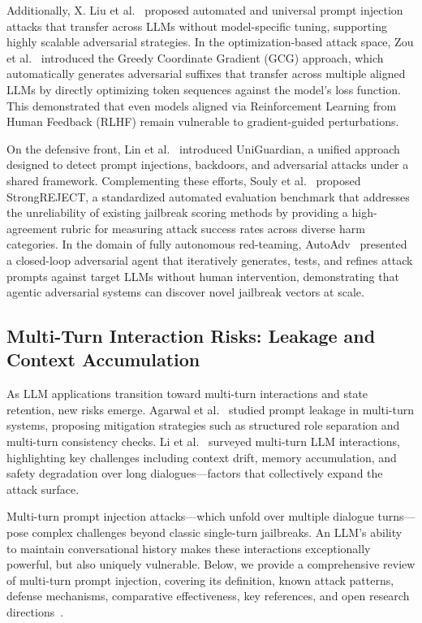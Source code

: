 \documentclass[10pt, a4paper]{article}
\begin{document}
Additionally, X. Liu et al.~\cite{liux2024universal} proposed automated and universal prompt injection attacks that transfer across LLMs without model-specific tuning, supporting highly scalable adversarial strategies. In the optimization-based attack space, Zou et al.~\cite{zou2023gcg} introduced the Greedy Coordinate Gradient (GCG) approach, which automatically generates adversarial suffixes that transfer across multiple aligned LLMs by directly optimizing token sequences against the model's loss function. This demonstrated that even models aligned via Reinforcement Learning from Human Feedback (RLHF) remain vulnerable to gradient-guided perturbations. 

On the defensive front, Lin et al.~\cite{lin2024uniguardian} introduced UniGuardian, a unified approach designed to detect prompt injections, backdoors, and adversarial attacks under a shared framework. Complementing these efforts, Souly et al.~\cite{souly2024strongreject} proposed StrongREJECT, a standardized automated evaluation benchmark that addresses the unreliability of existing jailbreak scoring methods by providing a high-agreement rubric for measuring attack success rates across diverse harm categories. In the domain of fully autonomous red-teaming, AutoAdv~\cite{autoadv2025} presented a closed-loop adversarial agent that iteratively generates, tests, and refines attack prompts against target LLMs without human intervention, demonstrating that agentic adversarial systems can discover novel jailbreak vectors at scale.

\subsection{Multi-Turn Interaction Risks: Leakage and Context Accumulation}
As LLM applications transition toward multi-turn interactions and state retention, new risks emerge. Agarwal et al.~\cite{agarwal2024} studied prompt leakage in multi-turn systems, proposing mitigation strategies such as structured role separation and multi-turn consistency checks. Li et al.~\cite{li2024} surveyed multi-turn LLM interactions, highlighting key challenges including context drift, memory accumulation, and safety degradation over long dialogues---factors that collectively expand the attack surface.

Multi-turn prompt injection attacks---which unfold over multiple dialogue turns---pose complex challenges beyond classic single-turn jailbreaks. An LLM's ability to maintain conversational history makes these interactions exceptionally powerful, but also uniquely vulnerable. Below, we provide a comprehensive review of multi-turn prompt injection, covering its definition, known attack patterns, defense mechanisms, comparative effectiveness, key references, and open research directions~\cite{huang2024, liu2023houyi}.
\end{document}

